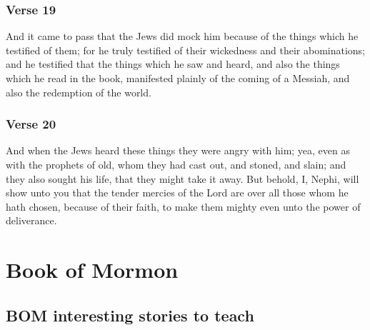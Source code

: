 		\subsubsection{Verse 19}  And it came to pass that the Jews did mock him because of the things which he testified of them; for he truly testified of their wickedness and their abominations; and he testified that the things which he saw and heard, and also the things which he read in the book, manifested plainly of the coming of a Messiah, and also the redemption of the world.
		\subsubsection{Verse 20}  And when the Jews heard these things they were angry with him; yea, even as with the prophets of old, whom they had cast out, and stoned, and slain; and they also sought his life, that they might take it away.  But behold, I, Nephi, will show unto you that the tender mercies of the Lord are over all those whom he hath chosen, because of their faith, to make them mighty even unto the power of deliverance.


\section{Book of Mormon} %

\subsection{BOM interesting stories to teach} %

